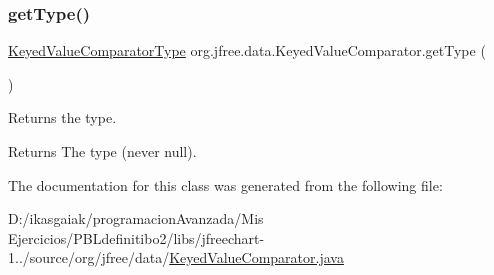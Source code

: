 \subsubsection{\texorpdfstring{get\+Type()}{getType()}}
{\footnotesize\ttfamily \mbox{\hyperlink{classorg_1_1jfree_1_1data_1_1_keyed_value_comparator_type}{Keyed\+Value\+Comparator\+Type}} org.\+jfree.\+data.\+Keyed\+Value\+Comparator.\+get\+Type (\begin{DoxyParamCaption}{ }\end{DoxyParamCaption})}

Returns the type.

\begin{DoxyReturn}{Returns}
The type (never {\ttfamily null}). 
\end{DoxyReturn}


The documentation for this class was generated from the following file\+:\begin{DoxyCompactItemize}
\item 
D\+:/ikasgaiak/programacion\+Avanzada/\+Mis Ejercicios/\+P\+B\+Ldefinitibo2/libs/jfreechart-\/1../source/org/jfree/data/\mbox{\hyperlink{_keyed_value_comparator_8java}{Keyed\+Value\+Comparator.\+java}}\end{DoxyCompactItemize}
